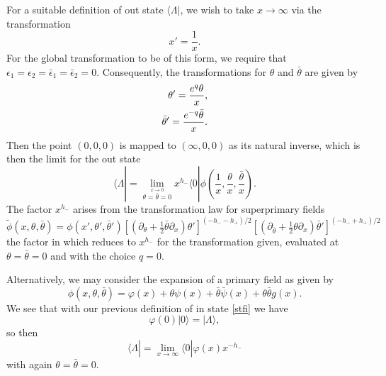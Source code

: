 \documentclass[a4paper,12pt]{article}
\def\thetabar    {\bar{\theta}}
\def\hf          {\tfrac{1}{2}}
\begin{document}
For a suitable definition of out state
$\langle \Lambda|$, we wish to take $x \rightarrow \infty$ via the
transformation
\begin{equation}
x'=\frac{1}{x}.
\end{equation}
For the global transformation to be of this form, we require that
$\epsilon_1=\epsilon_2=\bar{\epsilon}_1=\bar{\epsilon}_2=0$.  Consequently,
the transformations for $\theta$ and $\thetabar$ are given by
\begin{align}
\theta'=\frac{e^q\theta}{x},\notag\\
\thetabar'=\frac{e^{-q}\thetabar}{x}.
\end{align}
Then the point $(0,0,0)$ is mapped to $(\infty,0,0)$ as its natural
inverse, which is then the limit for the out state 
\begin{equation}
\langle \Lambda|= \lim_{\stackrel{\scriptstyle x\rightarrow
0}{\theta=\thetabar=0}} x^{h_-}\langle0|\phi\left(\frac{1}{x},
\frac{\theta}{x},\frac{\thetabar}{x}\right). 
\end{equation}
The factor $x^{h_-}$ arises from the transformation law for superprimary
fields \cite{Kir}
\begin{equation}
\tilde{\phi}(x,\theta,\thetabar) =
\phi(x',\theta',\thetabar')[(\partial_{\theta}+\hf
\thetabar\partial_x)\theta']^{(-h_--h_+)/2} [(\partial_{\thetabar}+\hf
\theta\partial_x)\thetabar']^{(-h_-+h_+)/2}
\end{equation}  
the factor in which reduces to $x^{h_-}$ for the transformation given, 
evaluated at $\theta=\thetabar=0$ and with the choice $q=0$.
 
Alternatively, we may consider the expansion of a primary field as given by
\begin{equation}
\phi(x,\theta,\thetabar)=\varphi(x)+\theta\psi(x)+
\thetabar\bar{\psi}(x)+\theta\thetabar g(x). 
\end{equation}
We see that with our previous definition of in state \eqref{stfi} we have 
\begin{equation}
\varphi(0)|0 \rangle = |\Lambda \rangle,
\end{equation}
so then
\begin{equation}
\langle \Lambda |=\lim_{x \rightarrow \infty}\langle 0 |\varphi(x)
x^{-h_-}
\end{equation}
with again $\theta=\thetabar=0$.
\end{document}
